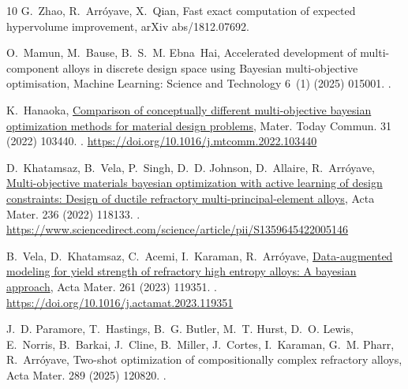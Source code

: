 \documentclass[preprint,12pt,times]{elsarticle}  %
\providecommand{\JournalTitle}[1]{#1}
\begin{document}
\begin{thebibliography}{10}
G.~Zhao, R.~Arr{\'o}yave, X.~Qian, Fast exact computation of expected
  hypervolume improvement, {\JournalTitle{arXiv}} abs/1812.07692.

O.~Mamun, M.~Bause, B.~S.~M. Ebna~Hai, Accelerated development of
  multi-component alloys in discrete design space using {Bayesian}
  multi-objective optimisation, {\JournalTitle{Machine Learning: Science and
  Technology}} 6~(1) (2025) 015001.
\newblock \href {http://dx.doi.org/10.1088/2632-2153/ada47d}
  {}.

K.~Hanaoka, \href{https://doi.org/10.1016/j.mtcomm.2022.103440}{Comparison of
  conceptually different multi-objective bayesian optimization methods for
  material design problems}, {\JournalTitle{Mater. Today Commun.}} 31
  (2022) 103440.
\newblock \href {http://dx.doi.org/10.1016/j.mtcomm.2022.103440}
  {}.
\newline\urlprefix\url{https://doi.org/10.1016/j.mtcomm.2022.103440}

D.~Khatamsaz, B.~Vela, P.~Singh, D.~D. Johnson, D.~Allaire, R.~Arr{\'{o}}yave,
  \href{https://www.sciencedirect.com/science/article/pii/S1359645422005146}{{Multi-objective
  materials bayesian optimization with active learning of design constraints:
  Design of ductile refractory multi-principal-element alloys}},
  {\JournalTitle{Acta Mater.}} 236 (2022) 118133.
\newblock \href {http://dx.doi.org/10.1016/j.actamat.2022.118133}
  {}.
\newline\urlprefix\url{https://www.sciencedirect.com/science/article/pii/S1359645422005146}

B.~Vela, D.~Khatamsaz, C.~Acemi, I.~Karaman, R.~Arróyave,
  \href{https://doi.org/10.1016/j.actamat.2023.119351}{Data-augmented modeling
  for yield strength of refractory high entropy alloys: A bayesian approach},
  {\JournalTitle{Acta Mater.}} 261 (2023) 119351.
\newblock \href {http://dx.doi.org/10.1016/j.actamat.2023.119351}
  {}.
\newline\urlprefix\url{https://doi.org/10.1016/j.actamat.2023.119351}

J.~D. Paramore, T.~Hastings, B.~G. Butler, M.~T. Hurst, D.~O. Lewis, E.~Norris,
  B.~Barkai, J.~Cline, B.~Miller, J.~Cortes, I.~Karaman, G.~M. Pharr,
  R.~Arróyave, Two-shot optimization of compositionally complex refractory
  alloys, {\JournalTitle{Acta Mater.}} 289 (2025) 120820.
\newblock \href {http://dx.doi.org/10.1016/j.actamat.2025.120820}
  {}.


\end{thebibliography}
\end{document}
